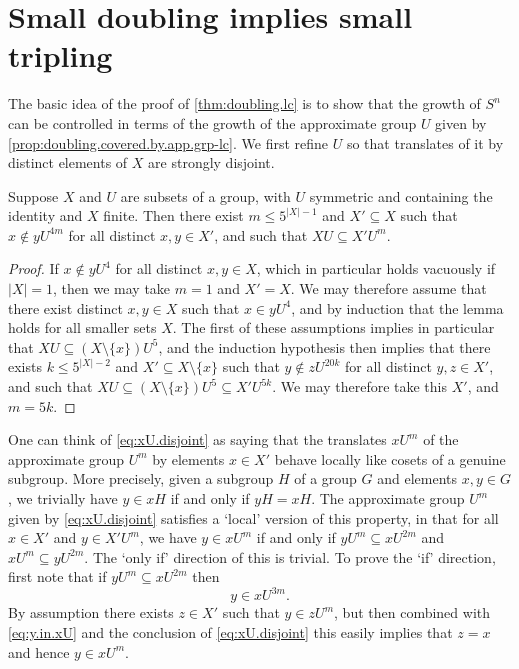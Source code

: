 \section{Small doubling implies small tripling}
The basic idea of the proof of \cref{thm:doubling.lc} is to show that the growth of $S^n$ can be controlled in terms of the growth of the approximate group $U$ given by \cref{prop:doubling.covered.by.app.grp-lc}. We first refine $U$ so that translates of it by distinct elements of $X$ are strongly disjoint.
\begin{lemma}\label{eq:xU.disjoint}
Suppose $X$ and $U$ are subsets of a group, with $U$ symmetric and containing the identity and $X$ finite. Then there exist $m\le5^{|X|-1}$ and $X'\subseteq X$ such that $x\notin yU^{4m}$ for all distinct $x,y\in X'$, and such that $XU\subseteq X'U^m$.
\end{lemma}
\begin{proof}
If $x\notin yU^{4}$ for all distinct $x,y\in X$, which in particular holds vacuously if $|X|=1$, then we may take $m=1$ and $X'=X$. We may therefore assume that there exist distinct $x,y\in X$ such that $x\in yU^{4}$, and by induction that the lemma holds for all smaller sets $X$. The first of these assumptions implies in particular that $XU\subseteq(X\setminus\{x\})U^5$, and the induction hypothesis then implies that there exists $k\le5^{|X|-2}$ and $X'\subseteq X\setminus\{x\}$ such that $y\notin zU^{20k}$ for all distinct $y,z\in X'$, and such that $XU\subseteq(X\setminus\{x\})U^5\subseteq X'U^{5k}$. We may therefore take this $X'$, and $m=5k$.
\end{proof}
One can think of \cref{eq:xU.disjoint} as saying that the translates $xU^m$ of the approximate group $U^m$ by elements $x\in X'$ behave locally like cosets of a genuine subgroup. More precisely, given a subgroup $H$ of a group $G$ and elements $x,y\in G$, we trivially have $y\in xH$ if and only if $yH=xH$. The approximate group $U^m$ given by \cref{eq:xU.disjoint} satisfies a `local' version of this property, in that for all $x\in X'$ and $y\in X'U^m$, we have $y\in xU^m$ if and only if $yU^m\subseteq xU^{2m}$ and $xU^m\subseteq yU^{2m}$. The `only if' direction of this is trivial. To prove the `if' direction, first note that if $yU^m\subseteq xU^{2m}$ then
\begin{equation}\label{eq:y.in.xU}
y\in xU^{3m}.
\end{equation}
By assumption there exists $z\in X'$ such that $y\in zU^m$, but then combined with \eqref{eq:y.in.xU} and the conclusion of \cref{eq:xU.disjoint} this easily implies that $z=x$ and hence $y\in xU^m$.

